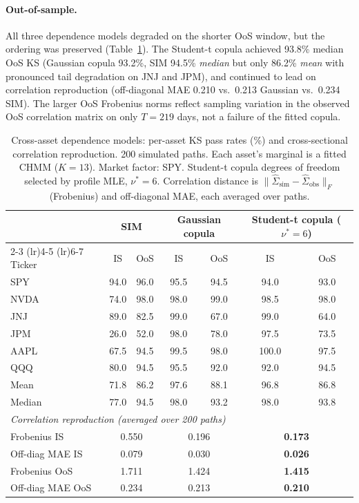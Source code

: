\paragraph{Out-of-sample.}
All three dependence models degraded on the shorter OoS window, but the ordering was preserved (Table~\ref{tab:cross_asset_sim_copula}).
The Student-t copula achieved 93.8\% median OoS KS (Gaussian copula 93.2\%, SIM 94.5\% \emph{median} but only 86.2\% \emph{mean} with pronounced tail degradation on JNJ and JPM), and continued to lead on correlation reproduction (off-diagonal MAE 0.210 vs.\ 0.213 Gaussian vs.\ 0.234 SIM).
The larger OoS Frobenius norms reflect sampling variation in the observed OoS correlation matrix on only $T = 219$ days, not a failure of the fitted copula.

\begin{table}[t]
\centering
\caption{Cross-asset dependence models: per-asset KS pass rates (\%) and cross-sectional correlation reproduction. 200 simulated paths. Each asset's marginal is a fitted CHMM ($K = 13$). Market factor: SPY. Student-t copula degrees of freedom selected by profile MLE, $\nu^* = 6$. Correlation distance is $\|\hat{\Sigma}_{\text{sim}} - \hat{\Sigma}_{\text{obs}}\|_F$ (Frobenius) and off-diagonal MAE, each averaged over paths.}
\label{tab:cross_asset_sim_copula}
\small
\begin{tabular}{l cc cc cc}
\toprule
& \multicolumn{2}{c}{SIM} & \multicolumn{2}{c}{Gaussian copula} & \multicolumn{2}{c}{Student-t copula ($\nu^* = 6$)} \\
\cmidrule(lr){2-3} \cmidrule(lr){4-5} \cmidrule(lr){6-7}
Ticker & IS & OoS & IS & OoS & IS & OoS \\
\midrule
SPY   & 94.0 & 96.0 & 95.5 & 94.5 & 94.0 & 93.0 \\
NVDA  & 74.0 & 98.0 & 98.0 & 99.0 & 98.5 & 98.0 \\
JNJ   & 89.0 & 82.5 & 99.0 & 67.0 & 99.0 & 64.0 \\
JPM   & 26.0 & 52.0 & 98.0 & 78.0 & 97.5 & 73.5 \\
AAPL  & 67.5 & 94.5 & 99.5 & 98.0 & 100.0 & 97.5 \\
QQQ   & 80.0 & 94.5 & 95.5 & 92.0 & 92.0 & 94.5 \\
\midrule
Mean  & 71.8 & 86.2 & 97.6 & 88.1 & 96.8 & 86.8 \\
Median & 77.0 & 94.5 & 98.0 & 93.2 & 98.0 & 93.8 \\
\midrule
\multicolumn{7}{l}{\textit{Correlation reproduction (averaged over 200 paths)}} \\
Frobenius IS         & \multicolumn{2}{c}{0.550} & \multicolumn{2}{c}{0.196} & \multicolumn{2}{c}{\textbf{0.173}} \\
Off-diag MAE IS      & \multicolumn{2}{c}{0.079} & \multicolumn{2}{c}{0.030} & \multicolumn{2}{c}{\textbf{0.026}} \\
Frobenius OoS        & \multicolumn{2}{c}{1.711} & \multicolumn{2}{c}{1.424} & \multicolumn{2}{c}{\textbf{1.415}} \\
Off-diag MAE OoS     & \multicolumn{2}{c}{0.234} & \multicolumn{2}{c}{0.213} & \multicolumn{2}{c}{\textbf{0.210}} \\
\bottomrule
\end{tabular}
\end{table}

